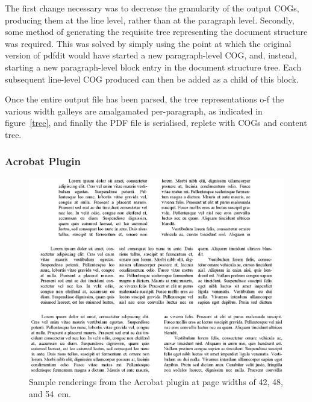 The first change necessary was to decrease the granularity of the output COGs, producing them at the
line level, rather than at the paragraph level. Secondly, some method of generating the requisite
tree representing the document structure was required. This was solved by simply using the point at
which the original version of pdfdit would have started a new paragraph-level COG, and, instead,
starting a new paragraph-level block entry in the document structure tree. Each subsequent
line-level COG produced can then be added as a child of this block.

Once the entire output file has been parsed, the tree representations o-f the various width galleys
are amalgamated per-paragraph, as indicated in figure~\ref{tree}, and finally the PDF file is
serialised, replete with COGs and content tree.






\subsubsection{Acrobat Plugin}
\begin{figure}
 \centering
 \includegraphics[width=\textwidth]{gfx/renderings}
 \caption[Sample renderings from the Acrobat plugin]{Sample renderings from the Acrobat plugin at
page widths of 42, 48, and
54~em.}
\end{figure}

